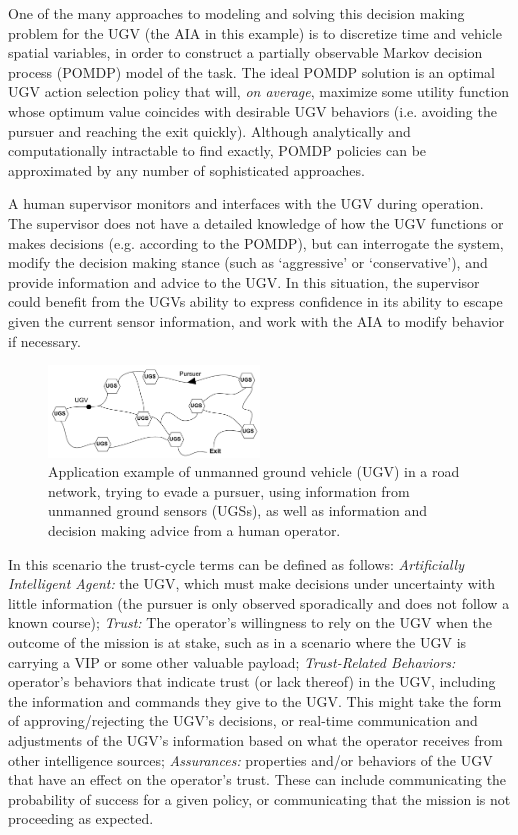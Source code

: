 One of the many approaches to modeling and solving this decision making problem for the UGV (the AIA in this example) is to discretize time and vehicle spatial variables, in order to construct a partially observable Markov decision process (POMDP) model of the task. 
The ideal POMDP solution is an optimal UGV action selection policy that will, \emph{on average}, maximize some utility function whose optimum value coincides with desirable UGV behaviors (i.e. avoiding the pursuer and reaching the exit quickly). 
Although analytically and computationally intractable to find exactly, POMDP policies can be approximated by any number of sophisticated approaches.

    A human supervisor monitors and interfaces with the UGV during operation. The supervisor does not have a detailed knowledge of how the UGV functions or makes decisions (e.g. according to the POMDP), but can interrogate the system, modify the decision making stance (such as `aggressive' or `conservative'), and provide information and advice to the UGV. In this situation, the supervisor could benefit from the UGVs ability to express confidence in its ability to escape given the current sensor information, and work with the AIA to modify behavior if necessary. 
    
	\begin{figure}[htbp]
    	\centering
     	\includegraphics[width=0.5\textwidth]{Figures/RoadNet}
    	\caption{Application example of unmanned ground vehicle (UGV) in a road network, trying to evade a pursuer, using information from unmanned ground sensors (UGSs), as well as information and decision making advice from a human operator.} %
        \label{fig:RoadNet}
    \end{figure}

In this scenario the trust-cycle terms can be defined as follows: \textit{Artificially Intelligent Agent:} the UGV, which must make decisions under uncertainty with little information (the pursuer is only observed sporadically and does not follow a known course); \textit{Trust:} The operator's willingness to rely on the UGV when the outcome of the mission is at stake, such as in a scenario where the UGV is carrying a VIP or some other valuable payload; 
\textit{Trust-Related Behaviors:} operator's behaviors that indicate trust (or lack thereof) in the UGV, including the information and commands they give to the UGV. This might take the form of approving/rejecting the UGV's decisions, or real-time communication and adjustments of the UGV's information based on what the operator receives from other intelligence sources; 
\textit{Assurances:} properties and/or behaviors of the UGV that have an effect on the operator's trust. These can include communicating the probability of success for a given policy, or communicating that the mission is not proceeding as expected.

